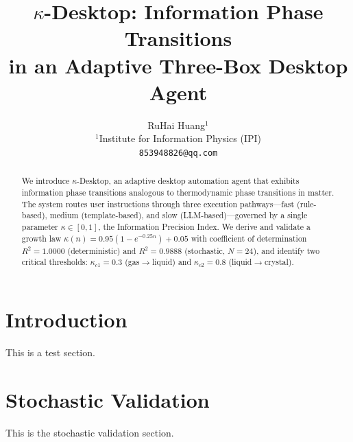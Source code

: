 \documentclass[10pt,twocolumn]{article}
\title{%
  \Large $\kappa$-Desktop: Information Phase Transitions \\
  in an Adaptive Three-Box Desktop Agent
}
\author{
  RuHai Huang$^{1}$ \\[4pt]
  {\small $^{1}$Institute for Information Physics (IPI)} \\
  {\small \texttt{853948826@qq.com}}
}
\date{}
\newcommand{\kap}{\kappa}
\newcommand{\kdes}{$\kappa$-Desktop}
\begin{document}
\maketitle
\thispagestyle{empty}

\begin{abstract}
\noindent
We introduce \kdes{}, an adaptive desktop automation agent 
that exhibits information phase transitions analogous to 
thermodynamic phase transitions in matter. The system routes 
user instructions through three execution pathways---fast 
(rule-based), medium (template-based), and slow 
(LLM-based)---governed by a single parameter 
$\kap \in [0,1]$, the Information Precision Index. We derive 
and validate a growth law $\kap(n) = 0.95(1-e^{-0.25n}) + 0.05$ 
with coefficient of determination $R^2 = 1.0000$ 
(deterministic) and $R^2 = 0.9888$ (stochastic, 
$N=24$), and identify 
two critical thresholds: $\kap_{c1} = 0.3$ 
(gas$\rightarrow$liquid) and $\kap_{c2} = 0.8$ 
(liquid$\rightarrow$crystal).
\end{abstract}

\section{Introduction}
This is a test section.

\section{Stochastic Validation}
This is the stochastic validation section.
\end{document}
